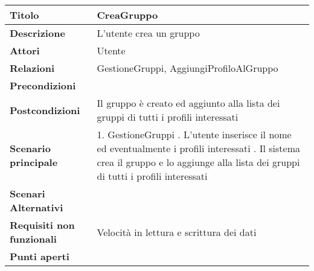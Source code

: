 \begin{tabular} {|P{4.5cm}|P{11cm}|}
  \hline
  \textbf{Titolo}                   & CreaGruppo                                                                          \\
  \hline
  \textbf{Descrizione}              & L'utente crea un gruppo                                                             \\
  \hline
  \textbf{Attori}                   & Utente                                                                              \\
  \hline
  \textbf{Relazioni}                & GestioneGruppi, AggiungiProfiloAlGruppo                                             \\
  \hline
  \textbf{Precondizioni}            &                                                                                     \\
  \hline
  \textbf{Postcondizioni}           & Il gruppo è creato ed aggiunto alla lista dei gruppi di tutti i profili interessati \\
  \hline
  \textbf{Scenario principale}      & 1. GestioneGruppi . L'utente inserisce il nome ed eventualmente i profili interessati . Il sistema crea il gruppo e lo aggiunge alla lista dei gruppi di tutti i profili interessati\linebreak               \\
  \hline
  \textbf{Scenari Alternativi}      &                                                                                     \\
  \hline
  \textbf{Requisiti non funzionali} & Velocità in lettura e scrittura dei dati                                            \\
  \hline
  \textbf{Punti aperti}             &                                                                                     \\
  \hline
\end{tabular}
\hfill
\break

